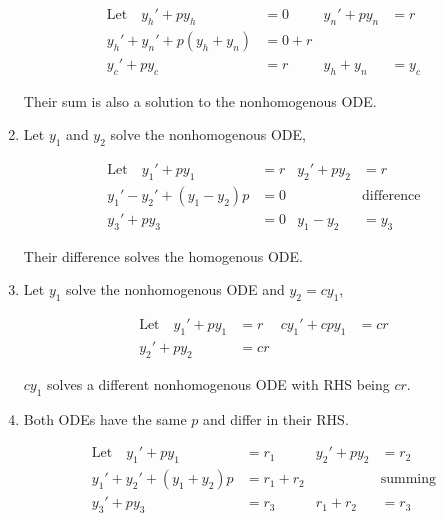 \begin{enumerate}
          \begin{align}
              \text{Let} \quad y_{h}' + py_{h}   & = 0     & y_{n}' + py_{n} & = r     \\
              y_{h}' + y_{n}' + p(y_{h} + y_{n}) & = 0 + r                             \\
              y_{c}' + py_{c}                    & = r     & y_{h} + y_{n}   & = y_{c}
          \end{align}

          Their sum is also a solution to the nonhomogenous ODE.

    \item Let $ y_{1} $ and $ y_{2} $ solve the nonhomogenous ODE,

          \begin{align}
              \text{Let} \quad y_{1}' + py_{1}   & = r & y_{2}' + py_{2} & = r               \\
              y_{1}' - y_{2}' + (y_{1} - y_{2})p & = 0 &                 & \text{difference} \\
              y_{3}' + py_{3}                    & = 0 & y_{1} - y_{2}   & = y_{3}
          \end{align}

          Their difference solves the homogenous ODE.

    \item Let $ y_{1} $ solve the nonhomogenous ODE and $ y_{2} = cy_{1} $,

          \begin{align}
              \text{Let} \quad y_{1}' + py_{1} & = r  & cy_{1}' + cpy_{1} & = cr \\
              y_{2}' + py_{2}                  & = cr
          \end{align}

          $ cy_{1} $ solves a different nonhomogenous ODE with RHS being $ cr $.

    \item Both ODEs have the same $ p $ and differ in their RHS.

          \begin{align}
              \text{Let} \quad y_{1}' + py_{1}   & = r_{1}         & y_{2}' + py_{2} & = r_{2}        \\
              y_{1}' + y_{2}' + (y_{1} + y_{2})p & = r_{1} + r_{2} &                 & \text{summing} \\
              y_{3}' + py_{3}                    & = r_{3}         & r_{1} + r_{2}   & = r_{3}
          \end{align}


\end{enumerate}
